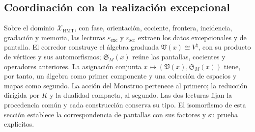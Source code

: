 \subsection{Coordinación con la realización excepcional}

Sobre el dominio \(\mathcal X_{\mathrm{HMT}}\), con fase, orientación,
cociente, frontera, incidencia, gradación y memoria, las lecturas
\(\varepsilon_{\mathrm{exc}}\) y \(\varepsilon_{\mathrm{scr}}\) extraen
los datos excepcionales y de pantalla. El corredor construye el álgebra
graduada \(\mathfrak V(x)\cong V^\natural\), con su producto de vértices
y sus automorfismos; \(\mathfrak S_M(x)\) reúne las pantallas, cocientes
y operadores anteriores. La asignación conjunta
\(x\mapsto(\mathfrak V(x),\mathfrak S_M(x))\) tiene, por tanto, un
álgebra como primer componente y una colección de espacios y mapas como segundo.
La acción del Monstruo pertenece al primero; la reducción dirigida por \(K\)
y la dualidad compacta, al segundo. Las dos lecturas fijan la procedencia
común y cada construcción conserva su tipo.
El isomorfismo de esta sección establece la correspondencia de
pantallas con sus factores y su prueba
explícitos.

\par\endgroup
